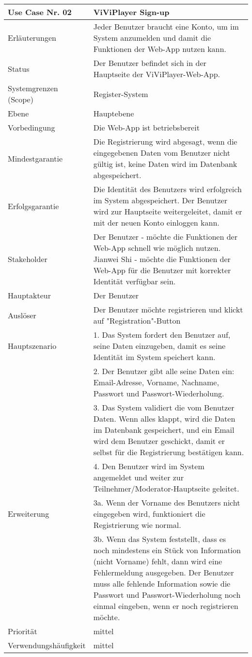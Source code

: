 \begin{tabularx}{\linewidth}{|l|X|}
	\hline
	Use Case Nr. 02			& \textbf{ViViPlayer Sign-up} \\ \hline
	Erläuterungen			& Jeder Benutzer braucht eine Konto, um im System anzumelden und damit die Funktionen
							  der Web-App nutzen kann. \\ \hline
	Status					& Der Benutzer befindet sich in der Hauptseite der ViViPlayer-Web-App. \\ \hline
	Systemgrenzen (Scope)	& Register-System \\ \hline
	Ebene					& Hauptebene \\ \hline
	Vorbedingung			& Die Web-App ist betriebsbereit \\ \hline
	Mindestgarantie			& Die Registrierung wird abgesagt, wenn die eingegebenen Daten vom Benutzer nicht gültig
							  ist, keine Daten wird im Datenbank abgespeichert. \\ \hline
	Erfolgsgarantie			& Die Identität des Benutzers wird erfolgreich im System abgespeichert. Der Benutzer
							  wird zur Hauptseite weitergeleitet, damit er mit der neuen Konto einloggen kann. \\ \hline
	Stakeholder				& Der Benutzer - möchte die Funktionen der Web-App schnell wie möglich nutzen. \newline
							  Jianwei Shi - möchte die Funktionen der Web-App für die Benutzer mit korrekter Identität
							  verfügbar sein.\\ \hline
	Hauptakteur				& Der Benutzer \\ \hline
	Auslöser				& Der Benutzer möchte registrieren und klickt auf "Registration"-Button \\ \hline	
	Hauptszenario			& 1. Das System fordert den Benutzer auf, seine Daten einzugeben, damit es seine
							  Identität im System speichert kann. \\
							& 2. Der Benutzer gibt alle seine Daten ein: Email-Adresse, Vorname, Nachname, Passwort 
							  und Passwort-Wiederholung.\\
							& 3. Das System validiert die vom Benutzer Daten. Wenn alles klappt, wird die Daten
							  im Datenbank gespeichert, und ein Email wird dem Benutzer geschickt, damit er selbst
							  für die Registrierung bestätigen kann. \\
							& 4. Den Benutzer wird im System angemeldet und weiter zur Teilnehmer/Moderator-Hauptseite
							  geleitet. \\ \hline
	Erweiterung				& 3a. Wenn der Vorname des Benutzers nicht eingegeben wird, funktioniert die Registrierung
							  wie normal. \\
							& 3b. Wenn das System feststellt, dass es noch mindestens ein Stück von Information (nicht
							  Vorname) fehlt, dann wird eine Fehlermeldung ausgegeben. Der Benutzer muss alle fehlende Information sowie die Passwort und Passwort-Wiederholung noch einmal eingeben, wenn er noch registrieren möchte. \\ \hline
	Priorität				& mittel \\ \hline
	Verwendungshäufigkeit	& mittel \\ \hline
\end{tabularx}
